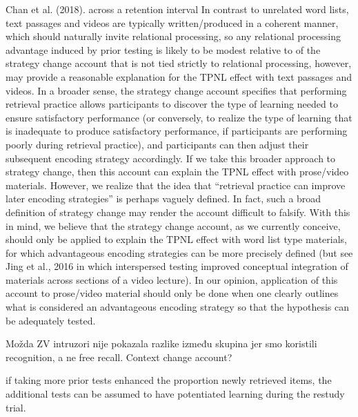 \documentclass[../main.tex]{subfiles}
\begin{document}
Chan et al. (2018). across a retention interval
In contrast to unrelated word lists, text passages and videos are
typically written/produced in a coherent manner, which should naturally
invite relational processing, so any relational processing advantage
induced by prior testing is likely to be modest relative to
of the strategy change account that is not tied strictly to relational
processing, however, may provide a reasonable explanation for the
TPNL effect with text passages and videos. In a broader sense, the
strategy change account specifies that performing retrieval practice
allows participants to discover the type of learning needed to ensure
satisfactory performance (or conversely, to realize the type of learning
that is inadequate to produce satisfactory performance, if participants
are performing poorly during retrieval practice), and participants can
then adjust their subsequent encoding strategy accordingly. If we take
this broader approach to strategy change, then this account can explain
the TPNL effect with prose/video materials. However, we realize that
the idea that “retrieval practice can improve later encoding strategies”
is perhaps vaguely defined. In fact, such a broad definition of strategy
change may render the account difficult to falsify. With this in mind, we
believe that the strategy change account, as we currently conceive,
should only be applied to explain the TPNL effect with word list type
materials, for which advantageous encoding strategies can be more
precisely defined (but see Jing et al., 2016 in which interspersed testing
improved conceptual integration of materials across sections of a video
lecture). In our opinion, application of this account to prose/video
material should only be done when one clearly outlines what is considered
an advantageous encoding strategy so that the hypothesis can
be adequately tested.


Možda ZV intruzori nije pokazala razlike između skupina jer smo koristili recognition, a ne free recall.
Context change account?


if taking more prior tests enhanced the proportion newly retrieved items,
the additional tests can be assumed to have potentiated learning during the restudy trial.
\end{document}
